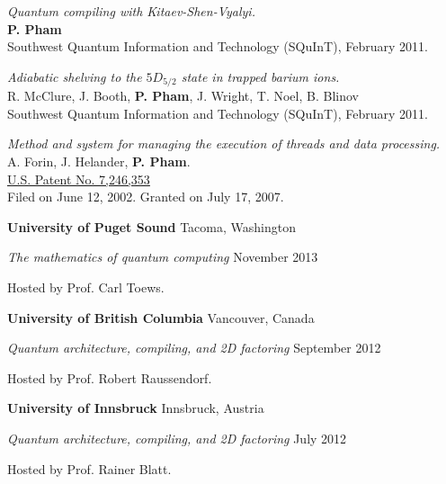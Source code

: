 \documentclass[letter]{article}
\begin{document}
\vspace{\baselineskip}
\par
\emph{Quantum compiling with Kitaev-Shen-Vyalyi.}\\
\textbf{P. Pham}\\
Southwest Quantum Information and Technology (SQuInT), February 2011.

\vspace{\baselineskip}
\par
\emph{Adiabatic shelving to the $5D_{5/2}$ state in trapped barium ions.}\\
R. McClure, J. Booth, \textbf{P. Pham}, J. Wright, T. Noel, B. Blinov\\
Southwest Quantum Information and Technology (SQuInT), February 2011.

\vspace{\baselineskip}

\emph{Method and system for managing the execution of threads and data processing.}
\\
A. Forin, J. Helander, \textbf{P. Pham}.\\
\href{http://patft.uspto.gov/netacgi/nph-Parser?Sect1=PTO2&Sect2=HITOFF&u=%2Fnetahtml%2FPTO%2Fsearch-adv.htm&r=1&p=1&f=G&l=50&d=PTXT&S1=20030233392&OS=20030233392&RS=20030233392}{U.S. Patent No. 7,246,353}\\
Filed on June 12, 2002.
Granted on July 17, 2007.

\vspace{\baselineskip}
\par
{\bf {University of Puget Sound}} \hfill Tacoma, Washington
\par
{\em The mathematics of quantum computing} \hfill November 2013
\par
Hosted by Prof. Carl Toews.

\vspace{\baselineskip}
\par
{\bf {University of British Columbia}} \hfill Vancouver, Canada
\par
{\em Quantum architecture, compiling, and 2D factoring} \hfill September 2012
\par
Hosted by Prof. Robert Raussendorf.

\vspace{\baselineskip}
\par
{\bf {University of Innsbruck}} \hfill Innsbruck, Austria
\par
{\em Quantum architecture, compiling, and 2D factoring} \hfill July 2012
\par
Hosted by Prof. Rainer Blatt.
\end{document}
